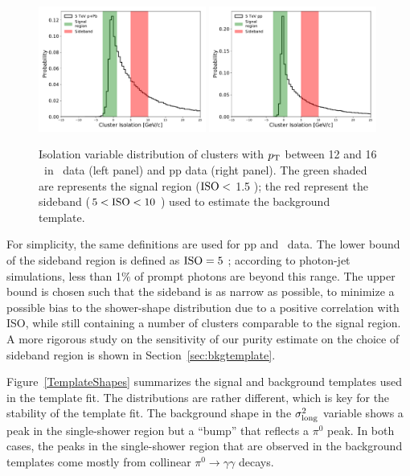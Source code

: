 \begin{figure}[h]
\center
\includegraphics[width=0.49\textwidth]{Purity/IsolationSideband_limited_Skimmed_13def_root}
\includegraphics[width=0.49\textwidth]{Purity/IsolationSideband_limited_Skimmed_17q_root}
\caption{Isolation variable distribution of clusters with $p_{\mathrm{T}}$ between 12 and 16 \GeVc~in \pPb~data (left panel) and pp data (right panel). The green shaded are represents the signal region ($\mathrm{ISO}<$ 1.5 \GeVc); the red represent the sideband ($5<\mathrm{ISO}<10$ \GeVc) used to estimate the background template.}
\label{SidebandDefinition}
\end{figure}

For simplicity, the same definitions are used for pp and \pPb~data. The lower bound of the sideband region is defined as {$\mathrm{ISO}=5$ \GeVc}; according to photon-jet simulations, less than 1$\%$ of prompt photons are beyond this range. The upper bound is chosen such that the sideband is as narrow as possible, to minimize a possible bias to the shower-shape distribution due to a positive correlation with ISO, while still containing a number of clusters comparable to the signal region. A more rigorous study on the sensitivity of our purity estimate on the choice of sideband region is shown in Section~\ref{sec:bkgtemplate}.

Figure~\ref{TemplateShapes} summarizes the signal and background templates used in the template fit. The distributions are rather different, which is key for the stability of the template fit. The background shape in the $\sigma^{2}_{\mathrm{long}}$ variable shows a peak in the single-shower region but a ``bump'' that reflects a $\pi^{0}$ peak. In both cases, the peaks in the single-shower region that are observed in the background templates come mostly from collinear $\pi^{0}\to\gamma\gamma$ decays.

